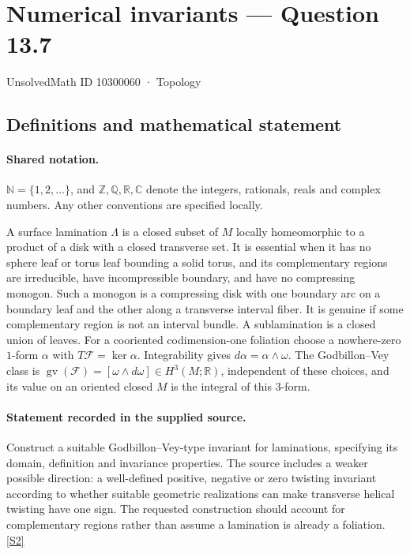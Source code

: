 \documentclass[11pt]{article}
\newcommand{\sref}[2]{\hyperlink{source:#1:#2}{[S#2]}}
\begin{document}
\setcounter{section}{10300059}
\section{Numerical invariants — Question 13.7}\label{10300060}
{\small\sffamily UnsolvedMath ID 10300060 · Topology}
\subsection{Definitions and mathematical statement}

\paragraph{Shared notation.}$\mathbb N=\{1,2,\ldots\}$, and $\mathbb Z,\mathbb Q,\mathbb R,\mathbb C$ denote the integers, rationals, reals and complex numbers. Any other conventions are specified locally.


A surface lamination $\Lambda$ is a closed subset of $M$ locally homeomorphic to a product of a disk with a closed transverse set. It is essential when it has no sphere leaf or torus leaf bounding a solid torus, and its complementary regions are irreducible, have incompressible boundary, and have no compressing monogon. Such a monogon is a compressing disk with one boundary arc on a boundary leaf and the other along a transverse interval fiber. It is genuine if some complementary region is not an interval bundle. A sublamination is a closed union of leaves. For a cooriented codimension-one foliation choose a nowhere-zero $1$-form $\alpha$ with $T\mathcal F=\ker\alpha$. Integrability gives $d\alpha=\alpha\wedge\omega$. The Godbillon--Vey class is $\operatorname{gv}(\mathcal F)=[\omega\wedge d\omega]\in H^3(M;\mathbb R)$, independent of these choices, and its value on an oriented closed $M$ is the integral of this $3$-form.
\paragraph{Statement recorded in the supplied source.}
Construct a suitable Godbillon--Vey-type invariant for laminations, specifying its domain, definition and invariance properties. The source includes a weaker possible direction: a well-defined positive, negative or zero twisting invariant according to whether suitable geometric realizations can make transverse helical twisting have one sign. The requested construction should account for complementary regions rather than assume a lamination is already a foliation. \sref{10300060}{2}
\end{document}
